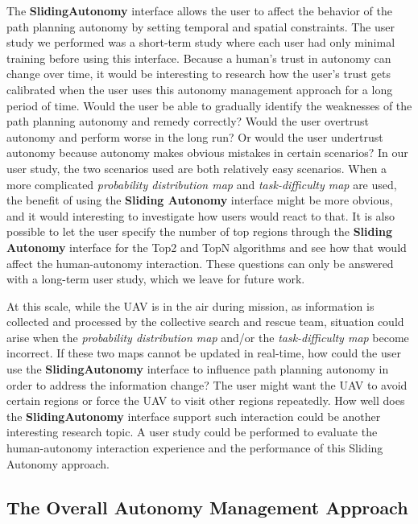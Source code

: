 The \textbf{SlidingAutonomy} interface allows the user to affect the behavior of the path planning autonomy by setting temporal and spatial constraints. The user study we performed was a short-term study where each user had only minimal training before using this interface. Because a human's trust in autonomy can change over time, it would be interesting to research how the user's trust gets calibrated when the user uses this autonomy management approach for a long period of time. Would the user be able to gradually identify the weaknesses of the path planning autonomy and remedy correctly? Would the user overtrust autonomy and perform worse in the long run? Or would the user undertrust autonomy because autonomy makes obvious mistakes in certain scenarios? In our user study, the two scenarios used are both relatively easy scenarios. When a more complicated \textit{probability distribution map} and \textit{task-difficulty map} are used, the benefit of using the \textbf{Sliding Autonomy} interface might be more obvious, and it would interesting to investigate how users would react to that. It is also possible to let the user specify the number of top regions through the \textbf{Sliding Autonomy} interface for the Top2 and TopN algorithms and see how that would affect the human-autonomy interaction. These questions can only be answered with a long-term user study, which we leave for future work.

At this scale, while the UAV is in the air during mission, as information is collected and processed by the collective search and rescue team, situation could arise when the \textit{probability distribution map} and/or the \textit{task-difficulty map} become incorrect. If these two maps cannot be updated in real-time, how could the user use the \textbf{SlidingAutonomy} interface to influence path planning autonomy in order to address the information change? The user might want the UAV to avoid certain regions or force the UAV to visit other regions repeatedly. How well does the \textbf{SlidingAutonomy} interface support such interaction could be another interesting research topic. A user study could be performed to evaluate the human-autonomy interaction experience and the performance of this Sliding Autonomy approach.


\subsection{The Overall Autonomy Management Approach}

